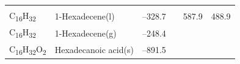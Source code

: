 \documentclass[
]{book}
\theoremstyle{definition}
\theoremstyle{definition}
\theoremstyle{definition}
\theoremstyle{remark}
\begin{document}
\begin{longtable}[]{@{}llllll@{}}
\begin{minipage}[t]{0.14\columnwidth}
\strut
\end{minipage}\tabularnewline
\begin{minipage}[t]{0.07\columnwidth}\raggedright
C\textsubscript{16}H\textsubscript{32}\strut
\end{minipage} & \begin{minipage}[t]{0.17\columnwidth}\raggedright
1-Hexadecene(l)\strut
\end{minipage} & \begin{minipage}[t]{0.15\columnwidth}\raggedright
--328.7\strut
\end{minipage} & \begin{minipage}[t]{0.15\columnwidth}\raggedright
\strut
\end{minipage} & \begin{minipage}[t]{0.14\columnwidth}\raggedright
587.9\strut
\end{minipage} & \begin{minipage}[t]{0.14\columnwidth}\raggedright
488.9\strut
\end{minipage}\tabularnewline
\begin{minipage}[t]{0.07\columnwidth}\raggedright
C\textsubscript{16}H\textsubscript{32}\strut
\end{minipage} & \begin{minipage}[t]{0.17\columnwidth}\raggedright
1-Hexadecene(g)\strut
\end{minipage} & \begin{minipage}[t]{0.15\columnwidth}\raggedright
--248.4\strut
\end{minipage} & \begin{minipage}[t]{0.15\columnwidth}\raggedright
\strut
\end{minipage} & \begin{minipage}[t]{0.14\columnwidth}\raggedright
\strut
\end{minipage} & \begin{minipage}[t]{0.14\columnwidth}\raggedright
\strut
\end{minipage}\tabularnewline
\begin{minipage}[t]{0.07\columnwidth}\raggedright
C\textsubscript{16}H\textsubscript{32}O\textsubscript{2}\strut
\end{minipage} & \begin{minipage}[t]{0.17\columnwidth}\raggedright
Hexadecanoic acid(s)\strut
\end{minipage} & \begin{minipage}[t]{0.15\columnwidth}\raggedright
--891.5\strut
\end{minipage} & \begin{minipage}[t]{0.15\columnwidth}\raggedright

\end{minipage}
\end{longtable}
\end{document}
